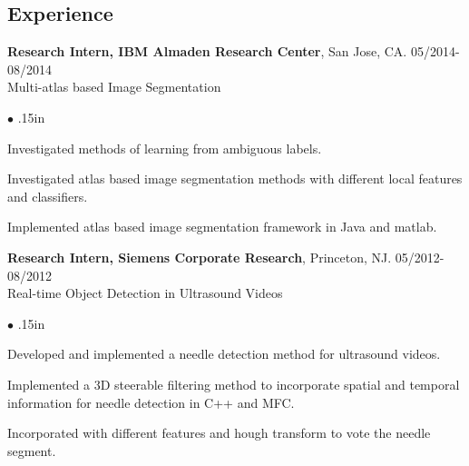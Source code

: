 \documentclass[line,margin]{res}
\newenvironment{bullets}{\begin{list}{\tiny$\bullet$}{\topsep 0pt \itemsep -2pt \leftmargin .15in}}{\vspace*{4pt}\end{list}}
\begin{document}
\begin{resume}
\vspace{-.05in}
\section{\sc Experience}
\smallskip


\textbf{Research Intern, IBM Almaden Research Center}, San Jose, CA. \hfill      05/2014-08/2014 \\
Multi-atlas based Image Segmentation
\begin{bullets} 
\item Investigated methods of learning from ambiguous labels.
\item Investigated atlas based image segmentation methods with different local features and classifiers.
\item Implemented atlas based image segmentation framework in Java and matlab.
\end{bullets}
\vspace{-.1in}

\textbf{Research Intern, Siemens Corporate Research}, Princeton, NJ. \hfill      05/2012-08/2012 \\
Real-time Object Detection in Ultrasound Videos
\begin{bullets} 
\item Developed and implemented a needle detection method for ultrasound videos. 
\item Implemented a 3D steerable filtering method to incorporate spatial and temporal information for needle detection in C++ and MFC.
\item Incorporated with different features and hough transform to vote the needle segment.
\end{bullets}
\vspace{-.1in}


\end{resume}
\end{document}
